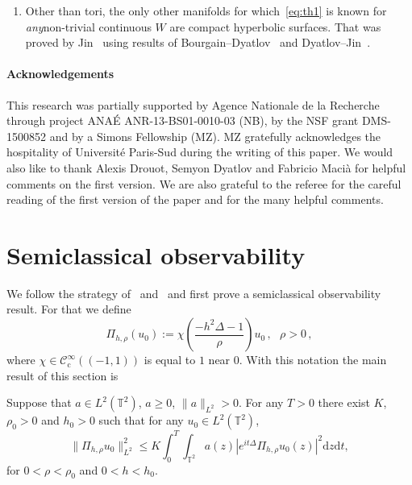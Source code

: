 \documentclass[AHL, Unicode, longabstracts]{cedram}
\newcommand{\CIc}{{\mathcal C}^\infty_{\mathrm{c}} }
\newcommand{\TT}{{\mathbb T}}
\newcommand{\TT}{{\mathbb T}}
\newcommand*{\dd}{\mathrm{d}}
\newcommand*{\dz}{\dd z}
\newcommand*{\dt}{\dd t}
\newenvironment{remasc*}{\let\pointir\relax \begin{remas*}}{\end{remas*}}
\begin{document}
\begin{remasc*}
\begin{enumerate}
\item \label{rem4} Other than tori, the only other manifolds for which~\eqref{eq:th1} is known for \emph{any}\linebreak non-trivial continuous $ W $ are compact hyperbolic surfaces. That was proved by Jin~\cite{Ji} using results of Bourgain--Dyatlov~\cite{BD} and Dyatlov--Jin~\cite{DJ}.
\end{enumerate}
\end{remasc*}

\paragraph*{Acknowledgements}
This research was partially supported by Agence Nationale de la Recherche through project ANAÉ ANR-13-BS01-0010-03 (NB), by the NSF grant DMS-1500852 and by a Simons Fellowship (MZ). MZ gratefully acknowledges the hospitality of Université Paris-Sud during the writing of this paper. We would also like to thank Alexis Drouot, Semyon Dyatlov and Fabricio Macià for helpful comments on the first version. We are also grateful to the referee for the careful reading of the first version of the paper and for the many helpful comments.


\section{Semiclassical observability}

We follow the strategy of~\cite{BZ4} and~\cite{BBZ} and first prove a semiclassical observability result. For that we define
\begin{equation}\label{eq:Pih}
\Pi_{h, \rho} (u_0) := \chi \left(\frac{ - h^2\Delta - 1} {\rho} \right) u_0\,, \ \ \ \rho > 0 \,,
\end{equation}
where $ \chi \in \CIc ((- 1, 1))$ is equal to $ 1 $ near $ 0 $. With this notation the main result of this section is
\begin{prop}\label{p:semi}
Suppose that $ a \in L^2 (\TT^2) $, $ a \geq 0 $, $ \| a \|_{L^2} > 0 $. For any $ T > 0 $ there exist $ K $, $ \rho_0 > 0 $ and $ h_0 > 0 $ such that for any $ u_0 \in L^2 (\TT^2) $,
\begin{equation}\label{eq:semi}
\| \Pi_{h, \rho} u_0 \|_{ L^2 }^2 \leq K \int_0^T \!\!\int_{ \TT^2} a (z) | e^{ i t \Delta} \Pi_{h, \rho} u_0 (z) |^2 \dz \dt,
\end{equation}
for $ 0 < \rho < \rho_0 $ and $ 0 < h < h_0 $.
\end{prop}
\end{document}

